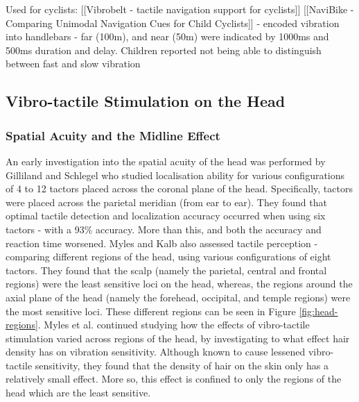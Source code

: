\documentclass{interim}
\begin{document}
Used for cyclists:
[[Vibrobelt - tactile navigation support for cyclists]]
[[NaviBike - Comparing Unimodal Navigation Cues for Child Cyclists]] - encoded vibration into handlebars - far (100m), and near (50m) were indicated by 1000ms and 500ms duration and delay. Children reported not being able to distinguish between fast and slow vibration


\subsection{Vibro-tactile Stimulation on the Head}
\subsubsection{Spatial Acuity and the Midline Effect}
An early investigation into the spatial acuity of the head was performed by Gilliland and Schlegel \cite{doi:10.1177/001872089403600410} who studied localisation ability for various configurations of 4 to 12 tactors placed across the coronal plane of the head. Specifically, tactors were placed across the parietal meridian (from ear to ear). They found that optimal tactile detection and localization accuracy occurred when using six tactors - with a 93\% accuracy. More than this, and both the accuracy and reaction time worsened. Myles and Kalb \cite{headguidelines} also assessed tactile perception - comparing different regions of the head, using various configurations of eight tactors. They found that the scalp (namely the parietal, central and frontal regions) were the least sensitive loci on the head, whereas, the regions around the axial plane of the head (namely the forehead, occipital, and temple regions) were the most sensitive loci. These different regions can be seen in Figure \ref{fig:head-regions}. Myles et al. \cite{MYLES2015177} continued studying how the effects of vibro-tactile stimulation varied across regions of the head, by investigating to what effect hair density has on vibration sensitivity. Although known to cause lessened vibro-tactile sensitivity, they found that the density of hair on the skin only has a relatively small effect. More so, this effect is confined to only the regions of the head which are the least sensitive.
\end{document}
